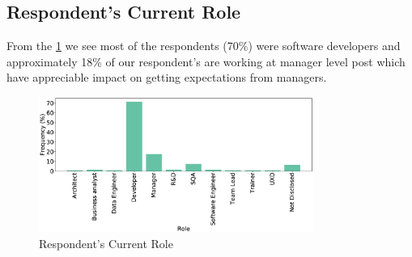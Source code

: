 \subsection{Respondent's Current Role}
From the \ref{fig:role} we see most of the respondents (70\%) were software developers and approximately 18\% of our respondent's are working at manager level post which have appreciable impact on getting expectations from managers.
\begin{figure}[H]
\centering
  \includegraphics[width=0.8\textwidth]{Figures/Respondents_Role}
  \caption{Respondent's Current Role}
  \label{fig:role}
\end{figure}